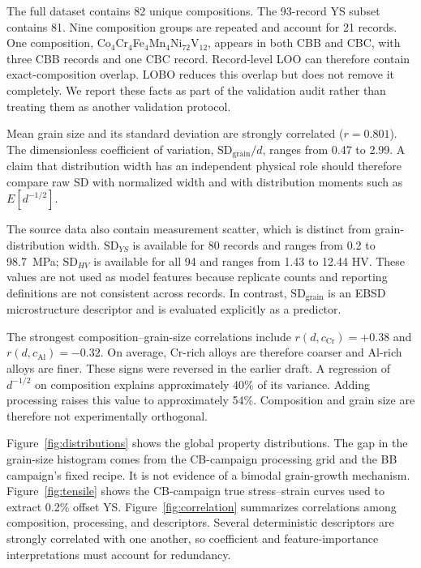 \documentclass[a4paper,11pt]{article}
\begin{document}
The full dataset contains 82 unique compositions. The 93-record YS subset contains 81. Nine composition groups are repeated and account for 21 records. One composition, Co$_4$Cr$_4$Fe$_4$Mn$_4$Ni$_{72}$V$_{12}$, appears in both CBB and CBC, with three CBB records and one CBC record. Record-level LOO can therefore contain exact-composition overlap. LOBO reduces this overlap but does not remove it completely. We report these facts as part of the validation audit rather than treating them as another validation protocol.

Mean grain size and its standard deviation are strongly correlated ($r=0.801$). The dimensionless coefficient of variation, $\mathrm{SD}_{\mathrm{grain}}/d$, ranges from 0.47 to 2.99. A claim that distribution width has an independent physical role should therefore compare raw SD with normalized width and with distribution moments such as $E[d^{-1/2}]$.

The source data also contain measurement scatter, which is distinct from grain-distribution width. $\mathrm{SD}_{YS}$ is available for 80 records and ranges from 0.2 to \SI{98.7}{MPa}; $\mathrm{SD}_{HV}$ is available for all 94 and ranges from 1.43 to 12.44 HV. These values are not used as model features because replicate counts and reporting definitions are not consistent across records. In contrast, $\mathrm{SD}_{\mathrm{grain}}$ is an EBSD microstructure descriptor and is evaluated explicitly as a predictor.

The strongest composition--grain-size correlations include $r(d,c_{\mathrm{Cr}})=+0.38$ and $r(d,c_{\mathrm{Al}})=-0.32$. On average, Cr-rich alloys are therefore coarser and Al-rich alloys are finer. These signs were reversed in the earlier draft. A regression of $d^{-1/2}$ on composition explains approximately 40\% of its variance. Adding processing raises this value to approximately 54\%. Composition and grain size are therefore not experimentally orthogonal.

Figure~\ref{fig:distributions} shows the global property distributions. The gap in the grain-size histogram comes from the CB-campaign processing grid and the BB campaign's fixed recipe. It is not evidence of a bimodal grain-growth mechanism. Figure~\ref{fig:tensile} shows the CB-campaign true stress--strain curves used to extract 0.2\% offset YS. Figure~\ref{fig:correlation} summarizes correlations among composition, processing, and descriptors. Several deterministic descriptors are strongly correlated with one another, so coefficient and feature-importance interpretations must account for redundancy.
\end{document}
